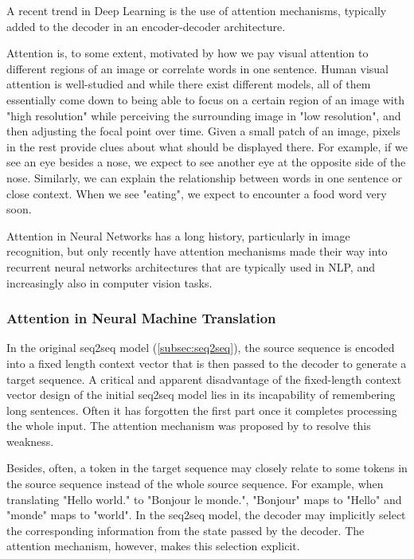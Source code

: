 A recent trend in Deep Learning is the use of attention mechanisms, typically added to the decoder in an encoder-decoder architecture. 

Attention is, to some extent, motivated by how we pay visual attention to different regions of an image or correlate words in one sentence. Human visual attention is well-studied and while there exist different models, all of them essentially come down to being able to focus on a certain region of an image with "high resolution" while perceiving the surrounding image in "low resolution", and then adjusting the focal point over time. Given a small patch of an image, pixels in the rest provide clues about what should be displayed there. For example, if we see an eye besides a nose, we expect to see another eye at the opposite side of the nose. Similarly, we can explain the relationship between words in one sentence or close context. When we see "eating", we expect to encounter a food word very soon. 

Attention in Neural Networks has a long history, particularly in image recognition, but only recently have attention mechanisms made their way into recurrent neural networks architectures that are typically used in NLP, and increasingly also in computer vision tasks.

\subsubsection{Attention in Neural Machine Translation}

In the original seq2seq model (\cref{subsec:seq2seq}), the source sequence is encoded into a fixed length context vector that is then passed to the decoder to generate a target sequence. A critical and apparent disadvantage of the fixed-length context vector design of the initial seq2seq model lies in its incapability of remembering long sentences. Often it has forgotten the first part once it completes processing the whole input. The attention mechanism was proposed by \citet{Bahdanau2015} to resolve this weakness. 

Besides, often, a token in the target sequence may closely relate to some tokens in the source sequence instead of the whole source sequence. For example, when translating "Hello world." to "Bonjour le monde.", "Bonjour" maps to "Hello" and "monde" maps to "world".  In the seq2seq model, the decoder may implicitly select the corresponding information from the state passed by the decoder. The attention mechanism, however, makes this selection explicit.


